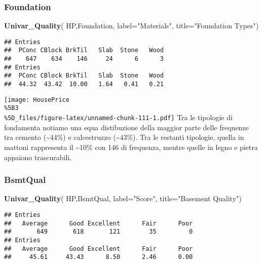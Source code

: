 \documentclass[
]{article}
\newenvironment{Shaded}{\begin{snugshade}}{\end{snugshade}}
\newcommand{\AttributeTok}[1]{\textcolor[rgb]{0.13,0.29,0.53}{#1}}
\newcommand{\FunctionTok}[1]{\textcolor[rgb]{0.13,0.29,0.53}{\textbf{#1}}}
\newcommand{\NormalTok}[1]{#1}
\newcommand{\StringTok}[1]{\textcolor[rgb]{0.31,0.60,0.02}{#1}}
\begin{document}
\subsubsection{Foundation}\label{foundation}

\begin{Shaded}
\begin{Highlighting}[]
\FunctionTok{Univar\_Quality}\NormalTok{(}
\NormalTok{  HP,Foundation,}
  \AttributeTok{label=}\StringTok{"Materials"}\NormalTok{,}
  \AttributeTok{title=}\StringTok{"Foundation Types"}\NormalTok{)}
\end{Highlighting}
\end{Shaded}

\begin{verbatim}
## Entries
##  PConc CBlock BrkTil   Slab  Stone   Wood 
##    647    634    146     24      6      3 
## Entries
##  PConc CBlock BrkTil   Slab  Stone   Wood 
##  44.32  43.42  10.00   1.64   0.41   0.21
\end{verbatim}

\texttt{[image: HousePrice\\\%5B3\\\%5D\_files/figure-latex/unnamed-chunk-111-1.pdf]}
Tra le tipologie di fondamenta notiamo una equa distibuzione della
maggior parte delle frequenze tra cemento (\textasciitilde44\%) e
calcestruzzo (\textasciitilde43\%). Tra le restanti tipologie, quella in
mattoni rappresenta il \textasciitilde10\% con 146 di frequenza, mentre
quelle in legno e pietra appaiono trascurabili.

\subsubsection{BsmtQual}\label{bsmtqual}

\begin{Shaded}
\begin{Highlighting}[]
\FunctionTok{Univar\_Quality}\NormalTok{(}
\NormalTok{  HP,BsmtQual,}
  \AttributeTok{label=}\StringTok{"Score"}\NormalTok{,}
  \AttributeTok{title=}\StringTok{"Basement Quality"}\NormalTok{)}
\end{Highlighting}
\end{Shaded}

\begin{verbatim}
## Entries
##   Average      Good Excellent      Fair      Poor 
##       649       618       121        35         0 
## Entries
##   Average      Good Excellent      Fair      Poor 
##     45.61     43.43      8.50      2.46      0.00
\end{verbatim}
\end{document}
